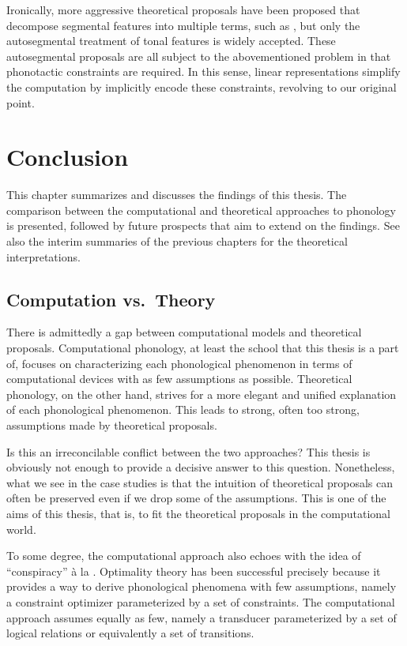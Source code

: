 \documentclass[12pt, a4paper]{report}
\begin{document}
Ironically, more aggressive theoretical proposals have been proposed
that decompose segmental features into multiple terms, such as
\textcite{klv85ispetcg}, but only the autosegmental treatment of tonal
features is widely accepted.  These autosegmental proposals are all
subject to the abovementioned problem in that phonotactic constraints
are required.  In this sense, linear representations simplify the
computation by implicitly encode these constraints, revolving to our
original point.

\chapter{Conclusion}
This chapter summarizes and discusses the findings of this thesis.
The comparison between the computational and theoretical approaches to
phonology is presented, followed by future prospects that aim to
extend on the findings.  See also the interim summaries of the
previous chapters for the theoretical interpretations.

\section{Computation vs.\ Theory}
There is admittedly a gap between computational models and theoretical
proposals.  Computational phonology, at least the school that this
thesis is a part of, focuses on characterizing each phonological
phenomenon in terms of computational devices with as few assumptions
as possible.  Theoretical phonology, on the other hand, strives for a
more elegant and unified explanation of each phonological phenomenon.
This leads to strong, often too strong, assumptions made by
theoretical proposals.

Is this an irreconcilable conflict between the two approaches?  This
thesis is obviously not enough to provide a decisive answer to this
question.  Nonetheless, what we see in the case studies is that the
intuition of theoretical proposals can often be preserved even if we
drop some of the assumptions.  This is one of the aims of this thesis,
that is, to fit the theoretical proposals in the computational world.

To some degree, the computational approach also echoes with the idea
of \enquote{conspiracy} à la \textcite{k70fupr}.  Optimality theory
has been successful precisely because it provides a way to derive
phonological phenomena with few assumptions, namely a constraint
optimizer parameterized by a set of constraints.  The computational
approach assumes equally as few, namely a transducer parameterized by
a set of logical relations or equivalently a set of transitions.
\end{document}
